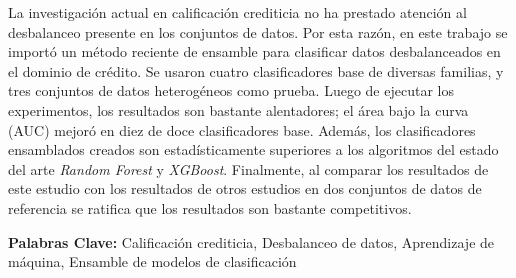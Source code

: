 \begin{resumen}
La investigación actual en calificación crediticia no ha prestado atención al desbalanceo presente en los conjuntos de datos. Por esta razón, en este trabajo se importó un método reciente de ensamble para clasificar datos desbalanceados en el dominio de crédito. Se usaron cuatro clasificadores base de diversas familias, y tres conjuntos de datos heterogéneos como prueba. Luego de ejecutar los experimentos, los resultados son bastante alentadores; el área bajo la curva (AUC) mejoró en diez de doce clasificadores base. Además, los clasificadores ensamblados creados son estadísticamente superiores a los algoritmos del estado del arte \textit{Random Forest} y \textit{XGBoost}. Finalmente, al comparar los resultados de este estudio con los resultados de otros estudios en dos conjuntos de datos de referencia se ratifica que los resultados son bastante competitivos.

\textbf{Palabras Clave:} Calificación crediticia, Desbalanceo de datos, Aprendizaje de máquina, Ensamble de modelos de clasificación
\end{resumen}



